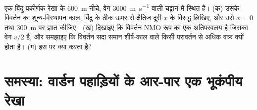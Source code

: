 \begin{exercise}[$\star\star\star$]\label{exo:b3:exploration-seismology:12}
एक बिंदु प्रकीर्णक रेखा के \qty{600}{m} नीचे, वेग
\qty{3000}{m.s^{-1}} वाली चट्टान में स्थित है। (क) उसके विवर्तन का शून्य-विस्थापन काल, बिंदु के ठीक ऊपर से क्षैतिज दूरी $x$ के
विरुद्ध लिखिए, और उसे $x = 0$ तथा
\qty{300}{m} पर ज्ञात कीजिए। (ख) दिखाइए कि विवर्तन NMO रूप का एक अतिपरवलय है
जिसका वेग $v/2$ है, और समझाइए कि विवर्तन सदा समान शीर्ष-काल वाले किसी
परावर्तन से अधिक वक्र क्यों होता है। (ग)  इस पर क्या करता है?
\end{exercise}

\section{समस्या: वार्डन पहाड़ियों के आर-पार एक भूकंपीय रेखा}

